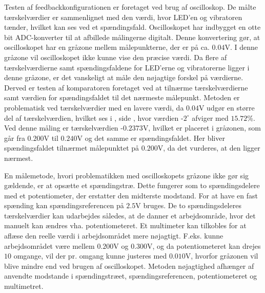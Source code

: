 Testen af feedbackkonfigurationen er foretaget ved brug af oscilloskop. De målte tærskelværdier er sammenlignet med den værdi, hvor LED'en og vibratoren tænder, hvilket kan ses ved et spændingsfald. Oscilloskopet har indbygget en otte bit ADC-konverter til at afbillede målingerne digitalt. Denne konvertering gør, at oscilloskopet har en gråzone mellem målepunkterne, der er på ca. $0.04$V. I denne gråzone vil oscilloskopet ikke kunne vise den præcise værdi. Da flere af tærskelværdierne samt spændingsfaldene for LED'erne og vibratorerne ligger i denne gråzone, er det vanskeligt at måle den nøjagtige forskel på værdierne. Derved er testen af komparatoren foretaget ved at tilnærme tærskelværdierne samt værdien for spændingsfaldet til det nærmeste målepunkt. Metoden er problematisk ved tærskelværdier med en lavere værdi, da $0.04$V udgør en større del af tærskelværdien, hvilket ses i , side \pageref{Tab:test-taendsluk}, hvor værdien  -$2^{\circ}$ afviger med $15.72$\%. Ved denne måling er tærskelværdien -$0.2373$V, hvilket er placeret i gråzonen, som går fra $0.200$V til $0.240$V og det samme er spændingsfaldet. Her bliver spændingsfaldet tilnærmet målepunktet på $0.200$V, da det vurderes, at den ligger nærmest.

En målemetode, hvori problematikken med oscilloskopets gråzone ikke gør sig gældende, er at opsætte et spændingstræ. Dette fungerer som to spændingsdelere med et potentiometer, der erstatter den midterste modstand. For at have en fast spænding kan spændingsreferencen på $2.5$V bruges. De to spændingsdeleres tærskelværdier kan udarbejdes således, at de danner et arbejdsområde, hvor det manuelt kan ændres vha. potentiometeret. Et multimeter kan tilkobles for at aflæse den reelle værdi i arbejdsområdet mere nøjagtigt. F.eks. kunne arbejdsområdet være mellem $0.200$V og $0.300$V, og da potentiometeret kan drejes $10$ omgange, vil der pr. omgang kunne justeres med $0.010$V, hvorfor gråzonen vil blive mindre end ved brugen af oscilloskopet. Metoden nøjagtighed afhænger af anvendte modstande i spændingstræet, spændingsreferencen, potentiometeret og multimetret. %

